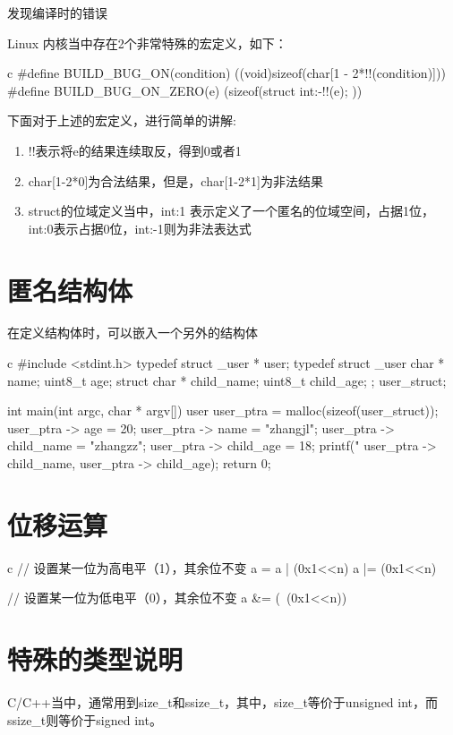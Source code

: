 \begin{outline}[enumerate]
\1 发现编译时的错误

Linux 内核当中存在2个非常特殊的宏定义，如下：
\begin{code-block}{c}
#define BUILD_BUG_ON(condition) ((void)sizeof(char[1 - 2*!!(condition)]))
#define BUILD_BUG_ON_ZERO(e) (sizeof(struct { int:-!!(e); }))
\end{code-block}

下面对于上述的宏定义，进行简单的讲解:
\begin{enumerate}
  \item !!表示将e的结果连续取反，得到0或者1
  \item char[1-2*0]为合法结果，但是，char[1-2*1]为非法结果
  \item struct的位域定义当中，int:1 表示定义了一个匿名的位域空间，占据1位，int:0表示占据0位，int:-1则为非法表达式
\end{enumerate}

\end{outline}

\section{匿名结构体}
在定义结构体时，可以嵌入一个另外的结构体
\begin{code-block}{c}
#include <stdint.h>
typedef struct _user * user;
typedef struct _user {
    char * name;
    uint8_t age;
    struct {
        char * child_name;
        uint8_t child_age;
    };
}user_struct;

int main(int argc, char * argv[])
{
    user user_ptra = malloc(sizeof(user_struct));
    user_ptra -> age = 20;
    user_ptra -> name = "zhangjl";
    user_ptra -> child_name = "zhangzz";
    user_ptra -> child_age = 18;
    printf("%
           user_ptra -> child_name, user_ptra -> child_age);
    return 0;
}
\end{code-block}

\section{位移运算}
\begin{code-block}{c}
// 设置某一位为高电平（1），其余位不变
a = a | (0x1<<n)
a |= (0x1<<n)

// 设置某一位为低电平（0），其余位不变
a &= (~(0x1<<n))
\end{code-block}

\section{特殊的类型说明}

C/C++当中，通常用到size\_t和ssize\_t，其中，size\_t等价于unsigned int，而
ssize\_t则等价于signed int。
